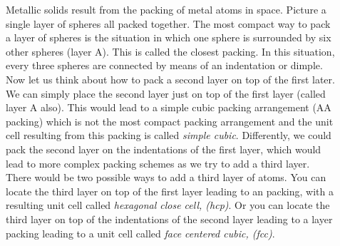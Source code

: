\documentclass[main.tex]{subfiles}
\begin{document}
\sloppy 
\begin{description}
   


\item[] 
Metallic solids result from the packing of metal atoms in space. Picture a single layer of spheres all packed together.  The most compact way to pack a layer of spheres is the situation in which one sphere is surrounded by six other spheres (layer A). This is called the closest packing. In this situation, every three spheres are connected by means of an indentation or dimple. Now let us think about how to pack a second layer on top of the first later. 
We can simply place the second layer just on top of the first layer (called layer A also). This would lead to a simple cubic packing arrangement (AA packing) which is not the most compact packing arrangement and the unit cell resulting from this packing is called \emph{simple cubic}. Differently, we could pack the second layer on the indentations of the first layer, which would lead to more complex packing schemes as we try to add a third layer. There would be two possible ways to add a third layer of atoms. You can locate the third layer on top of the first layer leading to an  packing, with a resulting unit cell called \emph{hexagonal close cell, (hcp)}. Or you can locate the third layer on top of the indentations of the second layer leading to a  layer packing leading to a unit cell called \emph{face centered cubic, (fcc)}. 



\end{description}
\end{document}
